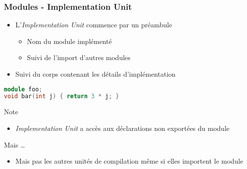 \documentclass[C++.tex]{subfiles}
\begin{document}
\begin{frame}[fragile]
	\frametitle{Modules - Implementation Unit}
	\begin{itemize}
		\item L'\textit{Implementation Unit} commence par un préambule
		\begin{itemize}
			\item Nom du module implémenté
			\item Suivi de l'import d'autres modules
		\end{itemize}
		\item Suivi du corps contenant les détails d'implémentation
	\end{itemize}

	\begin{lstlisting}[language=C++]
module foo;
void bar(int j) { return 3 * j; }\end{lstlisting}

	\begin{block}{Note}
		\begin{itemize}
			\item \textit{Implementation Unit} a accès aux déclarations non exportées du module
		\end{itemize}

	\end{block}

	\pause

	\begin{alertblock}{Mais \ldots}
		\begin{itemize}
			\item Mais pas les autres unités de compilation même si elles importent le module
		\end{itemize}
	\end{alertblock}
\end{frame}
\end{document}
